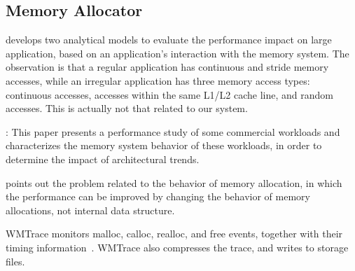 \subsection{Memory Allocator}

\cite{1291361} develops two analytical models to evaluate the performance impact on large application, based on an application's interaction with the memory system. The observation is that a regular application has continuous and stride memory accesses, while an irregular application has three memory access types: continuous accesses, accesses within the same L1/L2 cache line, and random accesses. This is actually not that related to our system. 


\cite{Barroso:1998:MSC:279358.279363}: This paper presents a performance study of some  commercial workloads and characterizes the memory system behavior of these workloads, in order to determine the impact of architectural trends.




\MP{} points out the problem related to the behavior of memory allocation, in which the performance can be improved by changing the behavior of memory allocations, not internal data structure. 
  


\cite{846583}

\cite{1190248}


WMTrace monitors malloc, calloc, realloc, and free events, together with their timing information~\cite{Perks:2011:WAP:2186355.2186369}. WMTrace also compresses the trace, and writes to storage files. 
 

